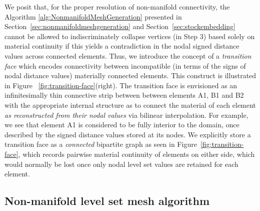 We posit that, for the proper resolution of non-manifold connectivity,
the Algorithm \ref{alg:NonmanifoldMeshGeneration} presented in 
Section~\ref{sec:nonmanifoldmeshgeneration} and
Section~\ref{sec:stockembedding} cannot be allowed to
indiscriminately collapse vertices (in Step 3) based solely on
material continuity if this yields a contradiction in the nodal
signed distance values across connected elements. Thus, we introduce
the concept of a \emph{transition face} which encodes connectivity
between incompatible (in terms of the signs of nodal distance values)
materially connected elements. This construct is illustrated in Figure
~\ref{fig:transition-face}(right). The transition face is envisioned
as an infinitesimally thin connective strip between between elements
\textsf{A1}, \textsf{B1} and \textsf{B2} with the appropriate internal
structure as to connect the material of each element \emph{as
  reconstructed from their nodal values} via bilinear
interpolation. For example, we see that element \textsf{A1} is
considered to be fully interior to the domain, once described by the
signed distance values stored at its nodes. We explicitly
  store a transition face as a \emph{connected} bipartite
graph as seen in Figure~\ref{fig:transition-face}, which
records pairwise material continuity of elements on
either side, which would normally be lost once only nodal level set
values are retained for each element.

\subsection{Non-manifold level set mesh algorithm}


